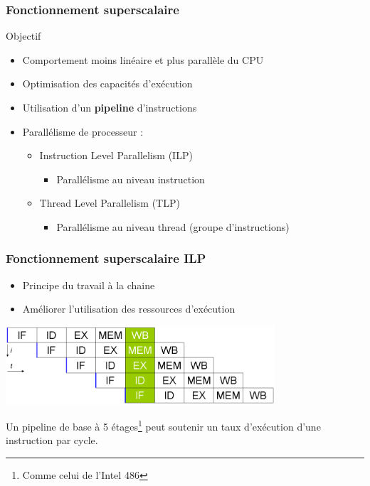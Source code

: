 \begin{frame}
\frametitle{Fonctionnement superscalaire}
\begin{block}{Objectif}
\begin{itemize}
\item Comportement moins linéaire et plus parallèle du CPU
\item Optimisation des capacités d'exécution
\end{itemize}
\end{block}
\begin{itemize}
\item Utilisation d'un \textbf{pipeline} d'instructions 
\item Parallélisme de processeur :
\begin{itemize}
\item Instruction Level Parallelism (ILP) 
\begin{itemize}
\item Parallélisme au niveau instruction
\end{itemize}
\item Thread Level Parallelism (TLP)  
\begin{itemize}
\item Parallélisme au niveau thread (groupe d'instructions)
\end{itemize}
\end{itemize}
\end{itemize}
\end{frame}

\begin{frame}
\frametitle{Fonctionnement superscalaire ILP}
\begin{itemize}
\item Principe du travail à la chaine
\item Améliorer l'utilisation des ressources d'exécution
\end{itemize}
\includegraphics[width=10cm]{../illustration/processeur-ILP.png}

Un pipeline de base à 5 étages\footnote{Comme celui de l'Intel 486} peut soutenir un taux d'exécution d'une instruction par cycle. \cite{wp-cpu}
\end{frame}

